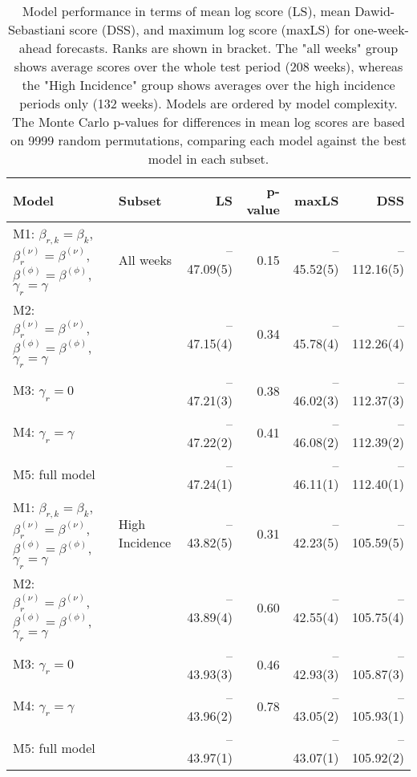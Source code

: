 \begin{table}[ht]
\centering
\begingroup\fontsize{9pt}{10pt}\selectfont
\begin{tabular}{ll|rrrr}
  \hline
Model & Subset & LS & p-value & maxLS & DSS \\ 
  \hline
M1: $\beta_{r,k} = \beta_{k}$, $\beta_{r}^{(\nu)} = \beta^{(\nu)}$, $\beta^{(\phi)} = \beta^{(\phi)}$, $\gamma_r = \gamma$ & All weeks & --47.09(5) & 0.15 & --45.52(5) & --112.16(5) \\ 
  M2: $\beta_{r}^{(\nu)} = \beta^{(\nu)}$, $\beta^{(\phi)} = \beta^{(\phi)}$, $\gamma_r = \gamma$ &  & --47.15(4) & 0.34 & --45.78(4) & --112.26(4) \\ 
  M3: $\gamma_r = 0$ &  & --47.21(3) & 0.38 & --46.02(3) & --112.37(3) \\ 
  M4: $\gamma_r = \gamma$ &  & --47.22(2) & 0.41 & --46.08(2) & --112.39(2) \\ 
  M5: full model &  & --47.24(1) &  & --46.11(1) & --112.40(1) \\ 
   \hline
M1: $\beta_{r,k} = \beta_{k}$, $\beta_{r}^{(\nu)} = \beta^{(\nu)}$, $\beta^{(\phi)} = \beta^{(\phi)}$, $\gamma_r = \gamma$ & High Incidence & --43.82(5) & 0.31 & --42.23(5) & --105.59(5) \\ 
  M2: $\beta_{r}^{(\nu)} = \beta^{(\nu)}$, $\beta^{(\phi)} = \beta^{(\phi)}$, $\gamma_r = \gamma$ &  & --43.89(4) & 0.60 & --42.55(4) & --105.75(4) \\ 
  M3: $\gamma_r = 0$ &  & --43.93(3) & 0.46 & --42.93(3) & --105.87(3) \\ 
  M4: $\gamma_r = \gamma$ &  & --43.96(2) & 0.78 & --43.05(2) & --105.93(1) \\ 
  M5: full model &  & --43.97(1) &  & --43.07(1) & --105.92(2) \\ 
   \hline
\end{tabular}
\endgroup
\caption{Model performance in terms of mean log score (LS),
             mean Dawid-Sebastiani score (DSS), and maximum log score (maxLS)
             for one-week-ahead forecasts.
             Ranks are shown in bracket.
             The "all weeks" group shows average scores over the
             whole test period (208 weeks),
             whereas the "High Incidence" group shows
             averages over the high incidence periods only (132 weeks).
             Models are ordered by model complexity.
             The Monte Carlo p-values for differences in mean log scores
             are based on 9999 random permutations,
             comparing each model against the best model in each subset.} 
\label{tab:forecast}
\end{table}
